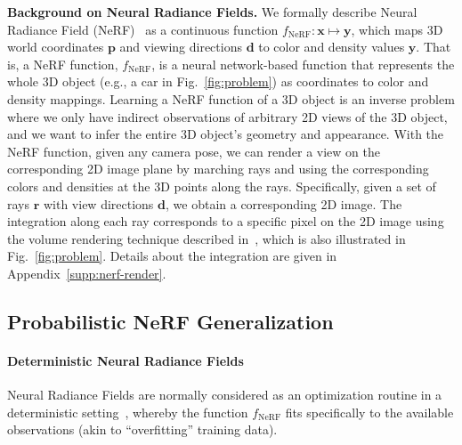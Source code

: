 \textbf{Background on Neural Radiance Fields.}
We formally describe Neural Radiance Field (NeRF)~\citep{mildenhall2021nerf, arandjelovic2021nerf} as a continuous function \( f_{\text{NeRF}}: \mathbf{x} \mapsto \mathbf{y} \), which maps 3D world coordinates \(\mathbf{p}\) and viewing directions \(\mathbf{d}\) to color and density values \(\mathbf{y}\). 
That is, a NeRF function, \( f_{\text{NeRF}} \), is a neural network-based function that represents the whole 3D object (e.g., a car in Fig.~\ref{fig:problem}) as coordinates to color and density mappings. Learning a NeRF function of a 3D object is an inverse problem where we only have indirect observations of arbitrary 2D views of the 3D object, and we want to infer the entire 3D object's geometry and appearance.
With the NeRF function, given any camera pose, we can render a view on the corresponding 2D image plane by marching rays and using the corresponding colors and densities at the 3D points along the rays. Specifically, given a set of rays \(\mathbf{r}\) with view directions \(\mathbf{d}\), we obtain a corresponding 2D image. The integration along each ray corresponds to a specific pixel on the 2D image using the volume rendering technique described in~\cite{kajiya1984ray}, which is also illustrated in Fig.~\ref{fig:problem}. Details about the integration are given in Appendix~\ref{supp:nerf-render}. 



%




\subsection{Probabilistic NeRF Generalization}

\paragraph{Deterministic Neural Radiance Fields} Neural Radiance Fields are normally considered as an optimization routine in a deterministic setting~\citep{mildenhall2021nerf,barron2021mip}, whereby the function $f_{\text{NeRF}}$ fits specifically to the available observations (akin to ``overfitting'' training data).

